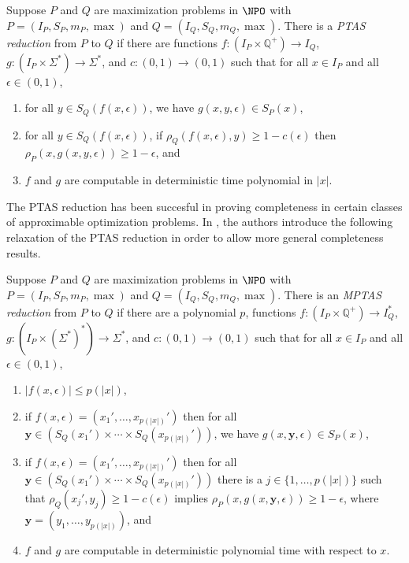 \documentclass{article}
\begin{document}
\begin{definition}\label{def:ptasreduction}
  Suppose $P$ and $Q$ are maximization problems in $\NPO$ with $P = (I_P, S_P, m_P, \max)$ and $Q = (I_Q, S_Q, m_Q, \max)$.
  There is a \emph{PTAS reduction} from $P$ to $Q$ if there are functions $f \colon \left(I_P \times \mathbb{Q}^+\right) \to I_Q$, $g \colon \left(I_P \times \Sigma^* \right) \to \Sigma^*$, and $c \colon (0, 1) \to (0, 1)$ such that for all $x \in I_P$ and all $\epsilon \in (0, 1)$,
  \begin{enumerate}
  \item for all $y \in S_Q(f(x, \epsilon))$, we have $g(x, y, \epsilon) \in S_P(x)$,
  \item for all $y \in S_Q(f(x, \epsilon))$, if $\rho_Q(f(x, \epsilon), y) \geq 1 - c(\epsilon)$ then $\rho_P(x, g(x, y, \epsilon)) \geq 1 - \epsilon$, and
  \item $f$ and $g$ are computable in deterministic time polynomial in $|x|$.
  \end{enumerate}
\end{definition}

The PTAS reduction has been succesful in proving completeness in certain classes of approximable optimization problems.
In \cite{ep06}, the authors introduce the following relaxation of the PTAS reduction in order to allow more general completeness results.

\begin{definition}\label{def:mptasreduction}
  Suppose $P$ and $Q$ are maximization problems in $\NPO$ with $P = (I_P, S_P, m_P, \max)$ and $Q = (I_Q, S_Q, m_Q, \max)$.
  There is an \emph{MPTAS reduction} from $P$ to $Q$ if there are a polynomial $p$, functions $f \colon \left(I_P \times \mathbb{Q}^+\right) \to I_Q^*$, $g \colon \left(I_P \times {\left(\Sigma^*\right)}^* \right) \to \Sigma^*$, and $c \colon (0, 1) \to (0, 1)$ such that for all $x \in I_P$ and all $\epsilon \in (0, 1)$,
  \begin{enumerate}
  \item $|f(x, \epsilon)| \leq p(|x|)$,
  \item if $f(x, \epsilon) = (x_1', \dotsc, x_{p(|x|)}')$ then for all $\mathbf{y} \in (S_Q(x_1') \times \dotsb \times S_Q(x_{p(|x|)}'))$, we have $g(x, \mathbf{y}, \epsilon) \in S_P(x)$,
  \item if $f(x, \epsilon) = (x_1', \dotsc, x_{p(|x|)}')$ then for all $\mathbf{y} \in (S_Q(x_1') \times \dotsb \times S_Q(x_{p(|x|)}'))$ there is a $j \in \{1, \dotsc, p(|x|)\}$ such that $\rho_Q(x_j', y_j) \geq 1 - c(\epsilon)$ implies $\rho_P(x, g(x, \mathbf{y}, \epsilon)) \geq 1 - \epsilon$, where $\mathbf{y} = (y_1, \dotsc, y_{p(|x|)})$, and
  \item $f$ and $g$ are computable in deterministic polynomial time with respect to $x$.
  \end{enumerate}
\end{definition}
\end{document}
